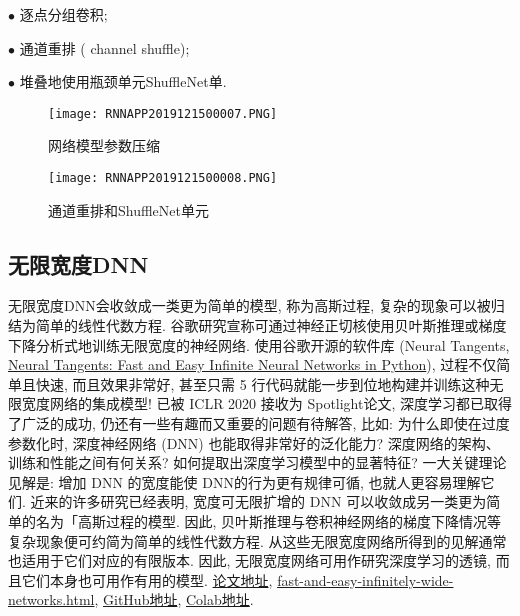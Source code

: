 \begin{tcolorbox}[title=ShuffleNet]

$\bullet$ 逐点分组卷积;

$\bullet$ 通道重排 ( channel shuffle);

$\bullet$ 堆叠地使用瓶颈单元ShuffleNet单.
\end{tcolorbox}
\begin{figure}[H]
    \centering
    \texttt{[image: RNNAPP2019121500007.PNG]}
    \caption{网络模型参数压缩}
    \label{RNNAPP2019121500007}\vspace{-0.4cm}
\end{figure}
\begin{figure}[H]
    \centering
    \texttt{[image: RNNAPP2019121500008.PNG]}
    \caption{通道重排和ShuffleNet单元}
    \label{RNNAPP2019121500008}\vspace{-0.4cm}
\end{figure}
\subsection{无限宽度DNN}
无限宽度DNN会收敛成一类更为简单的模型, 称为高斯过程, 复杂的现象可以被归结为简单的线性代数方程.
谷歌研究宣称可通过神经正切核使用贝叶斯推理或梯度下降分析式地训练无限宽度的神经网络.
使用谷歌开源的软件库 (Neural Tangents, \href{www.github.com/google/neural-tangents}{Neural Tangents: Fast and Easy Infinite Neural Networks in Python}),
过程不仅简单且快速, 而且效果非常好, 甚至只需 5 行代码就能一步到位地构建并训练这种无限宽度网络的集成模型!
已被 ICLR 2020 接收为 Spotlight论文, 深度学习都已取得了广泛的成功, 仍还有一些有趣而又重要的问题有待解答,
比如: 为什么即使在过度参数化时, 深度神经网络 (DNN) 也能取得非常好的泛化能力?
深度网络的架构、训练和性能之间有何关系? 如何提取出深度学习模型中的显著特征?
一大关键理论见解是: 增加 DNN 的宽度能使 DNN的行为更有规律可循, 也就人更容易理解它们.
近来的许多研究已经表明, 宽度可无限扩增的 DNN 可以收敛成另一类更为简单的名为「高斯过程的模型.
因此, 贝叶斯推理与卷积神经网络的梯度下降情况等复杂现象便可约简为简单的线性代数方程.
从这些无限宽度网络所得到的见解通常也适用于它们对应的有限版本.
因此, 无限宽度网络可用作研究深度学习的透镜, 而且它们本身也可用作有用的模型.
\href{https://arxiv.org/abs/1912.02803}{论文地址},
\href{https://ai.googleblog.com/2020/03/fast-and-easy-infinitely-wide-networks.html}{fast-and-easy-infinitely-wide-networks.html},
\href{https://github.com/google/neural-tangents}{GitHub地址},
\href{https://colab.research.google.com/github/google/neural-tangents/blob/master/notebooks/neural_tangents_cookbook.ipynb}{Colab地址}.

